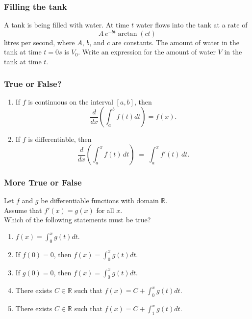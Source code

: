 \documentclass[14pt]{beamer}
\newcommand {\DS} [1] {${\displaystyle #1}$}
\newcommand {\R}{\mathbb{R}}
\newcommand{\setsize}[1]{\fontsize{#1}{#1}\selectfont} %
\newcommand{\smallerfont}{\setsize{13}} %
\begin{document}
\begin{frame}[t]
\frametitle{Filling the tank}

A tank is being filled with water.  At time $t$ water flows into the tank at a rate of
	$$
		A \, e^{-bt} \arctan (ct) 
	$$
litres per second, where $A$, $b$, and $c$ are constants.  The amount of water in the tank at time $t=0s$  is $V_0$.  Write an expression for the amount of water $V$ in the tank at time $t$.


\end{frame}
\begin{frame}[t]
\smallerfont
\frametitle{True or False?}

\begin{enumerate}
\item If $f$ is continuous on the interval $[a,b]$, then 
	$$\frac{d}{dx}\left( \int_a^b f(t)dt\right)=f(x).$$

\vspace{4mm}

\item If $f$ is differentiable, then 
	$$
		\frac{d}{dx} \left(\int_a^x f(t)\,dt \right) \; = \;   \int_a^x f'(t) \,dt .
	$$
 
\end{enumerate}

\end{frame}
\begin{frame}[t]
\smallerfont
\frametitle{More True or False}

Let $f$ and $g$ be differentiable functions with domain \DS{\R}.  \\
Assume that \DS{f'(x) = g(x)} for all $x$.  \\
Which of the following statements must be true?

	\begin{enumerate}
		\item  \DS{f(x) = \int_0^x g(t) dt}. 
		
						
		\item  If \DS{f(0)=0}, then \DS{f(x) = \int_0^x g(t) dt}.  
		
		
		\item  If \DS{g(0)=0}, then \DS{f(x) = \int_0^x g(t) dt}. 
		
		
		\item There exists $C \in \mathbb{R}$ such that \DS{f(x) = C + \int_0^x g(t) dt}.  
		
		
		\item  There exists $C\in \mathbb{R}$ such that \DS{f(x) = C + \int_1^x g(t) dt}.  
				
	\end{enumerate}
\end{frame}
\end{document}
